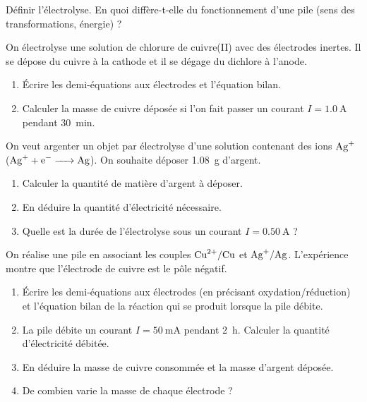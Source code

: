 
\exo{} Définir l'électrolyse. En quoi diffère-t-elle du fonctionnement d'une
pile (sens des transformations, énergie) ?

\exo{} On électrolyse une solution de chlorure de cuivre(II) avec des
électrodes inertes. Il se dépose du cuivre à la cathode et il se dégage du dichlore à
l'anode.
\begin{enumerate}[label=\arabic*)]
\item Écrire les demi-équations aux électrodes et l'équation bilan.
\item Calculer la masse de cuivre déposée si l'on fait passer un courant
$I = \SI{1.0}{\ampere}$ pendant \SI{30}{\minute}.
\end{enumerate}

\exo{} On veut argenter un objet par électrolyse d'une solution contenant des
ions $\ce{Ag+}$ ($\ce{Ag+ + e- -> Ag}$). On souhaite déposer \SI{1.08}{\gram}
d'argent.
\begin{enumerate}[label=\arabic*)]
\item Calculer la quantité de matière d'argent à déposer.
\item En déduire la quantité d'électricité nécessaire.
\item Quelle est la durée de l'électrolyse sous un courant $I = \SI{0.50}{\ampere}$ ?
\end{enumerate}


On réalise une pile en associant les couples $\ce{Cu^2+}/\ce{Cu}$ et
$\ce{Ag+}/\ce{Ag}$. L'expérience montre que l'électrode de cuivre est le pôle négatif.
\begin{enumerate}[label=\arabic*)]
\item Écrire les demi-équations aux électrodes (en précisant oxydation/réduction) et
l'équation bilan de la réaction qui se produit lorsque la pile débite.
\item La pile débite un courant $I = \SI{50}{\milli\ampere}$ pendant \SI{2}{\hour}.
Calculer la quantité d'électricité débitée.
\item En déduire la masse de cuivre consommée et la masse d'argent déposée.
\item De combien varie la masse de chaque électrode ?
\end{enumerate}
